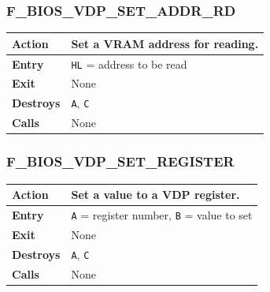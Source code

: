 \documentclass[a4paper,11pt]{article}
\begin{document}
        \subsubsection{F\_BIOS\_VDP\_SET\_ADDR\_RD}
        \label{func:fbiosvdpsetaddrrd}
        \begin{tabular}{l p{9cm}}
            \hline\textbf{Action}
            & Set a \textbf{VRAM} address for reading. \\
            \hline\textbf{Entry} & \texttt{HL} = address to be read\\
            \hline\textbf{Exit} & None\\
            \hline\textbf{Destroys} & \texttt{A}, \texttt{C} \\
            \hline\textbf{Calls} & None\\
            \hline
        \end{tabular}

        \subsubsection{F\_BIOS\_VDP\_SET\_REGISTER}
        \label{func:fbiosvdpsetregister}
        \begin{tabular}{l p{9cm}}
            \hline\textbf{Action}
            & Set a value to a \textbf{VDP} register. \\
            \hline\textbf{Entry} & \texttt{A} = register number, \texttt{B} =
            value to set\\
            \hline\textbf{Exit} & None\\
            \hline\textbf{Destroys} & \texttt{A}, \texttt{C} \\
            \hline\textbf{Calls} & None\\
            \hline
        \end{tabular}

\end{document}
